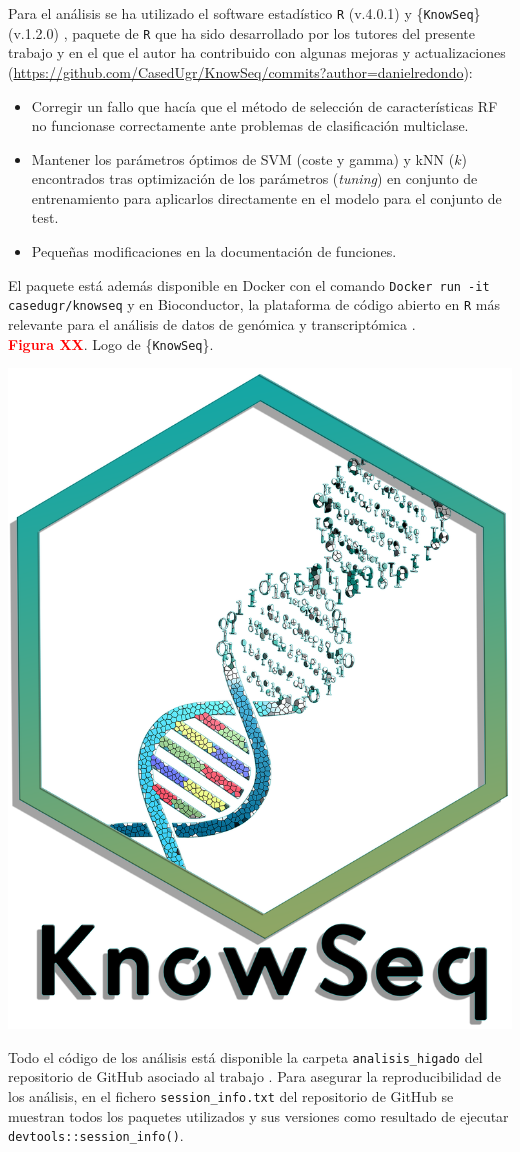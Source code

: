 Para el análisis se ha utilizado el software estadístico \texttt{R} (v.4.0.1) \cite{R} y \{\texttt{KnowSeq}\} (v.1.2.0) \cite{KnowSeq}, paquete de \texttt{R} que ha sido desarrollado por los tutores del presente trabajo y en el que el autor ha contribuido con algunas mejoras y actualizaciones (\url{https://github.com/CasedUgr/KnowSeq/commits?author=danielredondo}):

\begin{itemize}
	\item Corregir un fallo que hacía que el método de selección de características RF no funcionase correctamente ante problemas de clasificación multiclase.
	\item Mantener los parámetros óptimos de SVM (coste y gamma) y kNN ($k$) encontrados tras optimización de los parámetros (\textit{tuning}) en conjunto de entrenamiento para aplicarlos directamente en el modelo para el conjunto de test.
	\item Pequeñas modificaciones en la documentación de funciones.
\end{itemize}

El paquete está además disponible en Docker con el comando \texttt{Docker run -it casedugr/knowseq} y en Bioconductor, la plataforma de código abierto en \texttt{R} más relevante para el análisis de datos de genómica y transcriptómica \cite{Gentleman2004}.\\

\textbf{\textcolor{red}{Figura XX}}. Logo de \{\texttt{KnowSeq}\}.
\begin{center}
	\includegraphics[width=.4\textwidth]{figuras/knowseq.png} \\
\end{center}

Todo el código de los análisis está disponible la carpeta \texttt{analisis\_higado} del repositorio de GitHub asociado al trabajo \cite{Redondo-Sanchez2020}. Para asegurar la reproducibilidad de los análisis, en el fichero \texttt{session\_info.txt} del repositorio de GitHub \cite{Redondo-Sanchez2020} se muestran todos los paquetes utilizados y sus versiones como resultado de ejecutar \texttt{devtools::session\_info()}.\\


